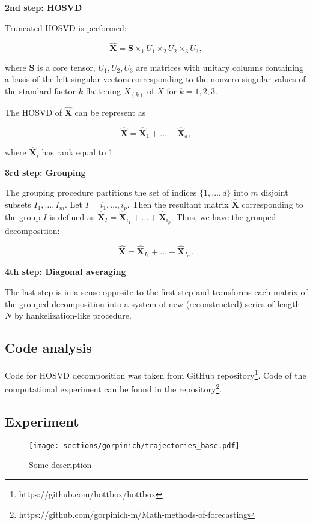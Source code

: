 \documentclass[../../main.tex]{subfiles}
\begin{document}
\textbf{2nd step: HOSVD}

Truncated HOSVD is performed:

$$\hat{\mathbf{X}} = \mathbf{S} \times_1 U_1 \times_2 U_2 \times_3 U_3,$$

\noindent
where $\mathbf{S}$ is a core tensor, $U_1, U_2, U_3$ are matrices with unitary columns containing a basis of the left singular vectors corresponding to the nonzero singular values of the standard factor-$k$ flattening $X_{(k)}$ of $X$ for $k = 1, 2, 3$.

The HOSVD of $\hat{\mathbf{X}}$ can be represent as

$$\hat{\mathbf{X}} = \hat{\mathbf{X}}_1 + \dots + \hat{\mathbf{X}}_d,$$

\noindent
where $\hat{\mathbf{X}}_i$ has rank equal to 1.

\textbf{3rd step: Grouping}

The grouping procedure partitions the
set of indices $\{1, \dots, d\}$ into $m$ disjoint subsets $I_1, \dots, I_m$. Let $I = {i_1, \dots, i_p}$. Then the resultant matrix $\hat{\mathbf{X}}$ corresponding to the group $I$ is defined as $\hat{\mathbf{X}}_I = \hat{\mathbf{X}}_{i_1} + \dots + \hat{\mathbf{X}}_{i_p}$. Thus, we have the grouped decomposition:

$$\hat{\mathbf{X}} = \hat{\mathbf{X}}_{I_1} + \dots + \hat{\mathbf{X}}_{I_m}.$$

\textbf{4th step: Diagonal averaging}

The last step is in a sense opposite to the first step and transforms each matrix of the grouped decomposition into a system of new (reconstructed) series of length $N$ by hankelization-like procedure.

\subsection{Code analysis}

Code for HOSVD decomposition was taken from GitHub repository\footnote{https://github.com/hottbox/hottbox}. Code of the computational experiment can be found in the repository\footnote{https://github.com/gorpinich-m/Math-methods-of-forecasting}.

\subsection{Experiment}

\begin{figure}[h!]
\centering
\texttt{[image: sections/gorpinich/trajectories\_base.pdf]}
\caption{Some description}
\label{fig:1}
\end{figure}
\end{document}
